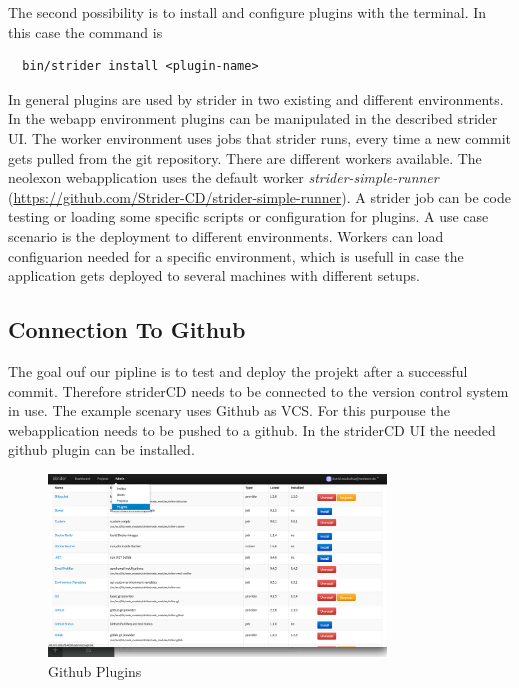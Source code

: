 The second possibility is to install and configure plugins with the terminal. In this case the command is
\begin{lstlisting}
  bin/strider install <plugin-name>
\end{lstlisting}

In general plugins are used by strider in two existing and different environments. In the webapp environment plugins can be manipulated
in the described strider UI. The worker environment uses jobs that strider runs, every time a new commit gets pulled from the git
repository. There are different workers available. The neolexon webapplication uses the default worker \textit{strider-simple-runner}
(\url{https://github.com/Strider-CD/strider-simple-runner}). A strider job can be code testing or loading some specific scripts or
configuration for plugins. A use case scenario is the deployment to different environments. Workers can load configuarion needed for
a specific environment, which is usefull in case the application gets deployed to several machines with different setups.

\newpage

\subsection{Connection To Github}
\label{subsection:Connection To Github}
The goal ouf our pipline is to test and deploy the projekt after a successful commit. Therefore striderCD needs to be connected to the version
control system in use. The example scenary uses Github as VCS. For this purpouse the webapplication needs to be pushed to a github. In the striderCD
UI the needed github plugin can be installed.

\begin{figure}[h!]
  \centering
      \includegraphics[width=0.8\textwidth]{images/plugin_page.png}
  \caption{Github Plugins}
\end{figure}


